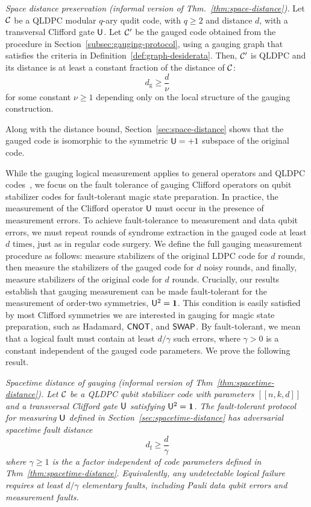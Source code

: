 \documentclass[11pt]{article}
\begin{document}
\begin{theorem}
    \emph{Space distance preservation (informal version of Thm.~\ref{thm:space-distance}).}
    Let $\mathcal{C}$ be a QLDPC modular $q$-ary qudit code, with $q\ge 2$ and distance $d$, with a transversal Clifford gate $\mathsf{U}$. 
    Let $\mathcal{C}'$ be the gauged code obtained from the procedure in Section~\ref{subsec:gauging-protocol}, using a gauging graph that satisfies the criteria in Definition~\ref{def:graph-desiderata}.
    Then, $\mathcal{C}'$ is QLDPC and its distance is at least a constant fraction of the distance of $\mathcal{C}$:
    \[
    d_{\mathrm{g}}\geq \frac{d}{\nu}
    \]
    for some constant $\nu\ge 1$ depending only on the local structure of the gauging construction.
\end{theorem}

\noindent
Along with the distance bound, Section~\ref{sec:space-distance} shows that the gauged code is isomorphic to the symmetric $\mathsf{U} = +1$ subspace of the original code.

While the gauging logical measurement applies to general operators and QLDPC codes~\cite{williamson2024lowoverheadfaulttolerantquantumcomputation}, we focus on the fault tolerance of gauging Clifford operators on qubit stabilizer codes for fault-tolerant magic state preparation.
In practice, the measurement of the Clifford operator $\mathsf{U}$ must occur in the presence of measurement errors. 
To achieve fault-tolerance to measurement and data qubit errors, we must repeat rounds of syndrome extraction in the gauged code at least $d$ times, just as in regular code surgery. 
We define the full gauging measurement procedure as follows: measure stabilizers of the original LDPC code for $d$ rounds, then measure the stabilizers of the gauged code for $d$ noisy rounds, and finally, measure stabilizers of the original code for $d$ rounds.   
Crucially, our results establish that gauging measurement can be made fault-tolerant for the measurement of order-two symmetries, $\mathsf{U}^2 = \mathbf{1}$. This condition is easily satisfied by most Clifford symmetries we are interested in gauging for magic state preparation, such as Hadamard, $\mathsf{CNOT}$, and $\mathsf{SWAP}$.
By fault-tolerant, we mean that a logical fault must contain at least $d/\gamma$ such errors, where $\gamma>0$ is a constant independent of the gauged code parameters.
We prove the following result.
\begin{theorem}
    \emph{Spacetime distance of gauging (informal version of Thm~\ref{thm:spacetime-distance}). Let $\mathcal{C}$ be a QLDPC qubit stabilizer code with parameters $[[n,k,d]]$ and a transversal Clifford gate $\mathsf{U}$ satisfying $\mathsf{U}^2=\mathbf{1}$.
    The fault-tolerant protocol for measuring $\mathsf{U}$ defined in Section~\ref{sec:spacetime-distance} has adversarial spacetime fault distance 
    \[ d_{\mathrm{f}}\ge \frac{d}{\gamma}
    \]
    where $\gamma\ge 1$ is the a factor independent of code parameters defined in Thm~\ref{thm:spacetime-distance}.
    Equivalently, any undetectable logical failure requires at least $d/\gamma$ elementary faults, including Pauli data qubit errors and measurement faults.}
\end{theorem}
\end{document}
